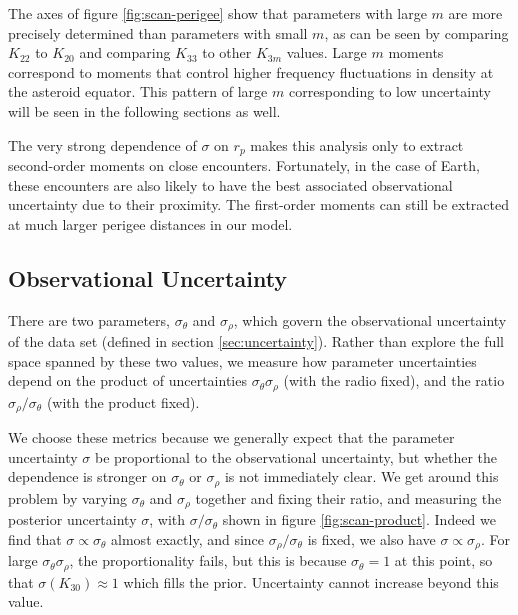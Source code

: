 \documentclass[fleqn,usenatbib]{mnras}
\begin{document}
The axes of figure \ref{fig:scan-perigee} show that parameters with large $m$ are more precisely determined than parameters with small $m$, as can be seen by comparing $K_{22}$ to $K_{20}$ and comparing $K_{33}$ to other $K_{3m}$ values. Large $m$ moments correspond to moments that control higher frequency fluctuations in density at the asteroid equator. This pattern of large $m$ corresponding to low uncertainty will be seen in the following sections as well.

The very strong dependence of $\sigma$ on $r_p$ makes this analysis only to extract second-order moments on close encounters. Fortunately, in the case of Earth, these encounters are also likely to have the best associated observational uncertainty due to their proximity. The first-order moments can still be extracted at much larger perigee distances in our model.


\subsection{Observational Uncertainty}
\label{sec:scan-uncertainty}
There are two parameters, $\sigma_\theta$ and $\sigma_\rho$, which govern the observational uncertainty of the data set (defined in section \ref{sec:uncertainty}). Rather than explore the full space spanned by these two values, we measure how parameter uncertainties depend on the product of uncertainties $\sigma_\theta\sigma_\rho$ (with the radio fixed), and the ratio $\sigma_\rho / \sigma_\theta$ (with the product fixed).

We choose these metrics because we generally expect that the parameter uncertainty $\sigma$ be proportional to the observational uncertainty, but whether the dependence is stronger on $\sigma_\theta$ or $\sigma_\rho$ is not immediately clear. We get around this problem by varying $\sigma_\theta$ and $\sigma_\rho$ together and fixing their ratio, and measuring the posterior uncertainty $\sigma$, with $\sigma/\sigma_\theta$ shown in figure \ref{fig:scan-product}. Indeed we find that $\sigma \propto \sigma_\theta$ almost exactly, and since $\sigma_\rho / \sigma_\theta$ is fixed, we also have $\sigma \propto \sigma_\rho$. For large $\sigma_\theta \sigma_\rho$, the proportionality fails, but this is because $\sigma_\theta = 1$ at this point, so that $\sigma(K_{30}) \approx 1$ which fills the prior. Uncertainty cannot increase beyond this value.
\end{document}
